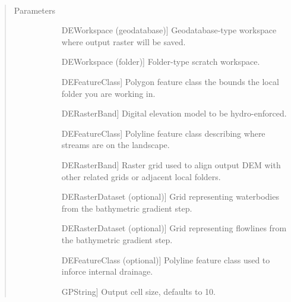 \documentclass[letterpaper,10pt,english]{sphinxmanual}
\begin{document}
\begin{fulllineitems}
\begin{fulllineitems}
\label{\detokenize{StreamStats_DataPrep:StreamStats_DataPrep.HydroDEM.getParameterInfo}}~\begin{quote}\begin{description}
\item[{Parameters}] \leavevmode\begin{description}
\item[{}] \leavevmode{[}DEWorkspace (geodatabase){]}
Geodatabase-type workspace where output raster will be saved.

\item[{}] \leavevmode{[}DEWorkspace (folder){]}
Folder-type scratch workspace.

\item[{}] \leavevmode{[}DEFeatureClass{]}
Polygon feature class the bounds the local folder you are working in.

\item[{}] \leavevmode{[}DERasterBand{]}
Digital elevation model to be hydro-enforced.

\item[{}] \leavevmode{[}DEFeatureClass{]}
Polyline feature class describing where streams are on the landscape.

\item[{}] \leavevmode{[}DERasterBand{]}
Raster grid used to align output DEM with other related grids or adjacent local folders.

\item[{}] \leavevmode{[}DERasterDataset (optional){]}
Grid representing waterbodies from the bathymetric gradient step.

\item[{}] \leavevmode{[}DERasterDataset (optional){]}
Grid representing flowlines from the bathymetric gradient step.

\item[{}] \leavevmode{[}DEFeatureClass (optional){]}
Polyline feature class used to inforce internal drainage.

\item[{}] \leavevmode{[}GPString{]}
Output cell size, defaults to 10.


\end{description}
\end{description}
\end{quote}
\end{fulllineitems}
\end{fulllineitems}
\end{document}
